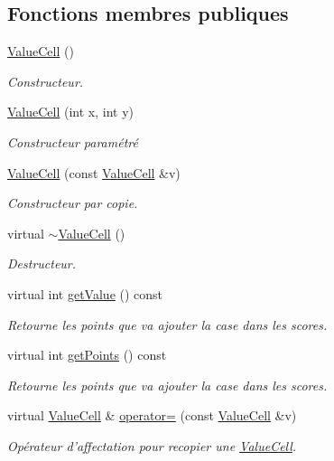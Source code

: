 \subsection*{Fonctions membres publiques}
\begin{DoxyCompactItemize}
\item 
\hyperlink{class_value_cell_a396940ba9e81a9e379f3d55963f29a11}{Value\-Cell} ()
\begin{DoxyCompactList}\small\item\em Constructeur. \end{DoxyCompactList}\item 
\hyperlink{class_value_cell_af86c31417f0a2073b56f4e9fa3e4de32}{Value\-Cell} (int x, int y)
\begin{DoxyCompactList}\small\item\em Constructeur paramétré \end{DoxyCompactList}\item 
\hyperlink{class_value_cell_af45bf8b6d1678f18e47c305c7bc8d7f0}{Value\-Cell} (const \hyperlink{class_value_cell}{Value\-Cell} \&v)
\begin{DoxyCompactList}\small\item\em Constructeur par copie. \end{DoxyCompactList}\item 
virtual \hyperlink{class_value_cell_a5fae05f9343efe76a1cc8e91d2194d60}{$\sim$\-Value\-Cell} ()
\begin{DoxyCompactList}\small\item\em Destructeur. \end{DoxyCompactList}\item 
virtual int \hyperlink{class_value_cell_a8868208306d97f8f0a7b3b37119f6351}{get\-Value} () const 
\begin{DoxyCompactList}\small\item\em Retourne les points que va ajouter la case dans les scores. \end{DoxyCompactList}\item 
virtual int \hyperlink{class_value_cell_a711326876009350576251e512fcf126e}{get\-Points} () const 
\begin{DoxyCompactList}\small\item\em Retourne les points que va ajouter la case dans les scores. \end{DoxyCompactList}\item 
virtual \hyperlink{class_value_cell}{Value\-Cell} \& \hyperlink{class_value_cell_a321b5f779a6d72254b4dd419ee5f776e}{operator=} (const \hyperlink{class_value_cell}{Value\-Cell} \&v)
\begin{DoxyCompactList}\small\item\em Opérateur d'affectation pour recopier une \hyperlink{class_value_cell}{Value\-Cell}. \end{DoxyCompactList}\end{DoxyCompactItemize}
